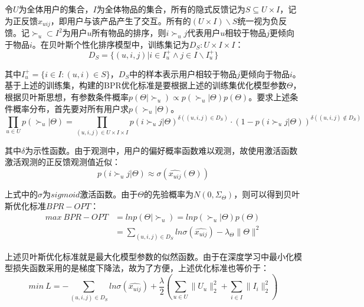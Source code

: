 \documentclass[lang=cn,11pt,a4paper,cite=authoryear]{elegantpaper}
\begin{document}
令$U$为全体用户的集合，$I$为全体物品的集合，所有的隐式反馈记为$S \subseteq U \times I$，记为正反馈$x_{uij}$，即用户与该产品产生了交互。所有的$(U \times I) \backslash S$统一视为负反馈。记$\succ_u \subset I^2$为用户$u$所有物品的排序，则$i \succ_u j$代表用户$u$相较于物品$j$更倾向于物品$i$。在贝叶斯个性化排序模型中，训练集记为$D_S : U \times I \times I$：
\begin{equation}
  D_S = \{ (u, i, j) | i \in I_u^+ \wedge j \in I \backslash I_u^+\}
\end{equation}

其中$I_u^+ = \{i \in I: (u, i) \in S\}$，$D_S$中的样本表示用户相较于物品$j$更倾向于物品$i$。基于上述的训练集，构建的BPR优化标准是要根据上述的训练集优化模型参数$\Theta$，根据贝叶斯思想，有参数条件概率$p(\Theta|\succ_u) \varpropto p(\succ_u|\Theta)p(\Theta)$。要求上述条件概率分布，首先要对所有用户求$p(\succ_u|\Theta)$。
\begin{equation}
  \prod_{u \in U}p(\succ_u|\Theta)=\prod_{(u, i, j) \in U \times I \times I}p(i \succ_u j|\Theta)^{\delta((u, i, j)\in D_S)} \cdot (1- p(i \succ_u j|\Theta))^{\delta((u, i, j) \notin D_S)}
\end{equation}

其中$\delta$为示性函数。由于观测中，用户的偏好概率函数难以观测，故使用激活函数激活观测的正反馈观测值近似：
\begin{equation}
  p(i \succ_u j|\Theta) \approx \sigma(\hat{x_{uij}}(\Theta))
\end{equation}

上式中的$\sigma$为$sigmoid$激活函数。由于$\Theta$的先验概率为$N(0, \Sigma_{\Theta})$，则可以得到贝叶斯优化标准$BPR-OPT$：
\begin{equation}
  \begin{split}
    max \ BPR-OPT &= ln p(\Theta|\succ_u) = ln p(\succ_u|\Theta)p(\Theta) \\
  &= \sum_{(u, i, j)\in D_S}ln\sigma(\hat{x_{uij}}) - \lambda_{\Theta}\parallel \Theta \parallel^2
  \end{split}
\end{equation}

上述贝叶斯优化标准就是最大化模型参数的似然函数。由于在深度学习中最小化模型损失函数采用的是梯度下降法，故为了方便，上述优化标准也等价于：
\begin{equation}
  min \ L = -\sum_{(u, i, j)\in D_S}ln\sigma(\hat{x_{uij}}) + \frac{\lambda}{2}(\sum_{u \in U}\parallel U_u \parallel_2^2+\sum_{i \in I}\parallel I_i \parallel_2^2)
\end{equation}
\end{document}

